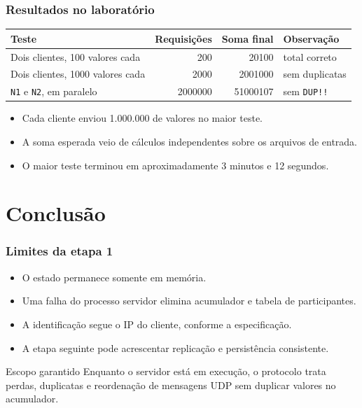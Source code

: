 \documentclass{beamer}
\begin{document}
\begin{frame}
  \frametitle{Resultados no laboratório}
  \small
  \begin{center}
    \begin{tabular}{@{}lrrl@{}}
      \toprule
      Teste & Requisições & Soma final & Observação \\
      \midrule
      Dois clientes, 100 valores cada & 200 & 20100 & total correto \\
      Dois clientes, 1000 valores cada & 2000 & 2001000 & sem duplicatas \\
      \texttt{N1} e \texttt{N2}, em paralelo & 2000000 & 51000107 & sem \texttt{DUP!!} \\
      \bottomrule
    \end{tabular}
  \end{center}

  \vspace{1em}
  \begin{itemize}
    \item Cada cliente enviou 1.000.000 de valores no maior teste.
    \item A soma esperada veio de cálculos independentes sobre os arquivos de entrada.
    \item O maior teste terminou em aproximadamente 3 minutos e 12 segundos.
  \end{itemize}
\end{frame}

\section{Conclusão}

\begin{frame}
  \frametitle{Limites da etapa 1}
  \begin{itemize}
    \item O estado permanece somente em memória.
    \item Uma falha do processo servidor elimina acumulador e tabela de participantes.
    \item A identificação segue o IP do cliente, conforme a especificação.
    \item A etapa seguinte pode acrescentar replicação e persistência consistente.
  \end{itemize}

  \vspace{1em}
  \begin{block}{Escopo garantido}
    Enquanto o servidor está em execução, o protocolo trata perdas, duplicatas e reordenação de mensagens UDP sem duplicar valores no acumulador.
  \end{block}
\end{frame}
\end{document}
